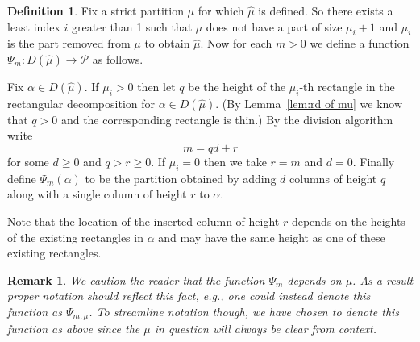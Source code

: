 \documentclass{article}
\theoremstyle{plain}
\newtheorem{remark}[theorem]{Remark}
\theoremstyle{definition}
\newtheorem{definition}[theorem]{Definition}
\renewcommand{\P}{\mathcal{P}}
\begin{document}
\begin{definition}
Fix a strict partition $\mu$ for which $\hat\mu$ is defined.  So there exists a least index $i$ greater than 1 such that $\mu$ does not have a part of size $\mu_i+1$ and $\mu_i$ is the part removed from $\mu$ to obtain $\hat\mu$.  Now for each $m>0$ we define a function $\Psi_m:D(\hat\mu)\to \P$ as follows.

Fix $\alpha\in D(\hat\mu)$.  If $\mu_i>0$ then let $q$ be the height of the $\mu_i$-th rectangle in the rectangular decomposition for $\alpha\in D(\hat\mu)$. (By Lemma~\ref{lem:rd of mu} we know that $q>0$ and the corresponding rectangle is thin.) By the division algorithm write 
$$m = qd +r$$ 
for some $d\geq 0$ and $q > r \geq 0$. If $\mu_i=0$ then we take $r = m$ and $d=0$. Finally define $\Psi_m(\alpha)$ to be the partition obtained by adding $d$ columns of height $q$ along with a single column of height $r$ to $\alpha$.

Note that the location of the inserted column of height $r$ depends on the heights of the existing rectangles in $\alpha$ and may have the same height as one of these existing rectangles.
\end{definition}

\begin{remark}
We caution the reader that the function $\Psi_m$ depends on $\mu$.  As a result proper notation should reflect this fact, e.g., one could instead denote this function as $\Psi_{m,\mu}$.  To streamline notation though, we have chosen to denote this function as above since the $\mu$ in question will always be clear from context. 
\end{remark}
\end{document}
